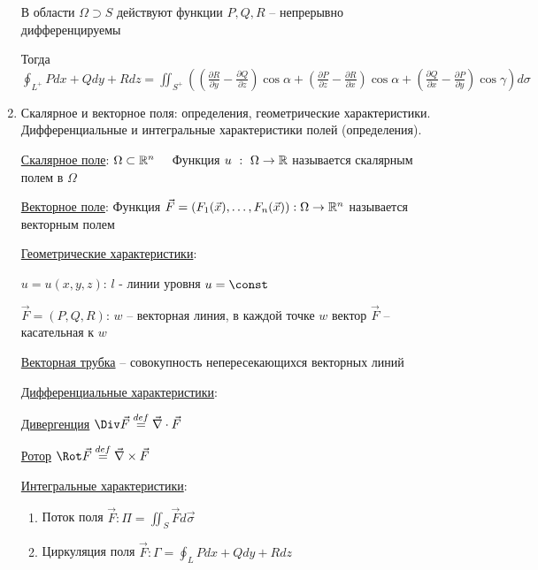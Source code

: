 \documentclass[12pt]{article}
\begin{document}
\begin{enumerate}
        В области $\Omega \supset S$ действуют функции $P, Q, R$ -- непрерывно дифференцируемы

        Тогда $\oint_{L^+} Pdx + Qdy + Rdz = \iint_{S^+} \left(\left(\frac{\partial R}{\partial y} - \frac{\partial Q}{\partial z}\right)\cos\alpha +
        \left(\frac{\partial P}{\partial z} - \frac{\partial R}{\partial x}\right)\cos\alpha + \left(\frac{\partial Q}{\partial x} - \frac{\partial P}{\partial y}\right)\cos\gamma\right) d\sigma$


        \item Скалярное и векторное поля: определения, геометрические характеристики. Дифференциальные и интегральные характеристики полей (определения).

        \hyperlink{scalarfield}{Скалярное поле}: $\Omega \subset \mathbb{R}^n \quad$ Функция $u \ : \ \Omega \to \mathbb{R}$ называется скалярным полем в $\Omega$

        \hyperlink{vectorfield}{Векторное поле}: Функция $\vec{F} = (F_1(\vec{x}), \dots, F_n(\vec{x})) : \Omega \to \mathbb{R}^n$ называется векторным полем

        \hyperlink{scalarandvectorfieldgeometric}{Геометрические характеристики}:

        $u = u(x, y, z)$: $l$ - линии уровня $u = \const$

        $\vec{F} = (P, Q, R)$: $w$ -- векторная линия, в каждой точке $w$ вектор $\vec{F}$ -- касательная к $w$

        \underline{Векторная трубка} -- совокупность непересекающихся векторных линий

        \hyperlink{differentialcharacteristics}{Дифференциальные характеристики}:

        \hyperlink{divergence}{Дивергенция} $\Div \vec{F} \stackrel{def}{=} \vec\nabla \cdot \vec{F}$

        \hyperlink{rotor}{Ротор} $\Rot \vec{F} \stackrel{def}{=} \vec\nabla \times \vec{F}$

        \hyperlink{integralcharacteristics}{Интегральные характеристики}:

        \begin{enumerate}
            \item Поток поля $\vec{F}: \Pi = \iint_S \vec{F}d\vec{\sigma}$

            \item Циркуляция поля $\vec{F}: \Gamma = \oint_L Pdx + Qdy + Rdz$
        \end{enumerate}


\end{enumerate}
\end{document}
